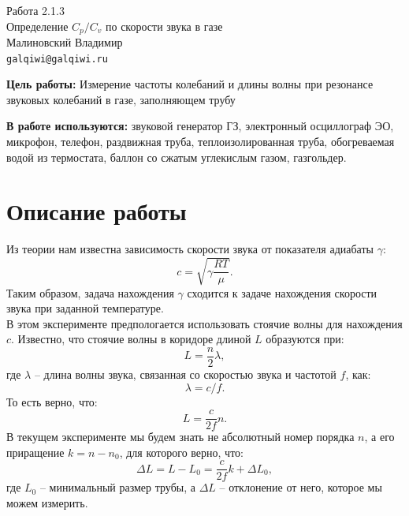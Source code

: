 
\usepackage{booktabs}
\usepackage{multirow}



\begin{center}
  \LARGE{Работа 2.1.3}\\[0.2cm]
  \LARGE{Определение $C_p/C_v$ по скорости звука в газе}\\[0.2cm]
  \large{Малиновский Владимир}\\[0.2cm]
  \normalsize{\texttt{galqiwi@galqiwi.ru}}
\end{center}

\textbf{Цель работы:} Измерение частоты колебаний и длины волны при резонансе звуковых колебаний в газе, заполняющем трубу

\textbf{В работе используются:} звуковой генератор ГЗ, электронный осциллограф ЭО, микрофон, телефон, раздвижная труба, теплоизолированная труба, обогреваемая водой из термостата, баллон со сжатым углекислым газом, газгольдер.

\section*{Описание работы}
Из теории нам известна зависимость скорости звука от показателя адиабаты $\gamma$:
$$c = \sqrt{\gamma\frac{RT}{\mu}}.$$
Таким образом, задача нахождения $\gamma$ сходится к задаче нахождения скорости звука при заданной температуре.\\
В этом эксперименте предпологается использовать стоячие волны для нахождения $c$. Известно, что стоячие волны в коридоре длиной $L$ образуются при:
$$L = \frac{n}{2}\lambda,$$
где $\lambda$ -- длина волны звука, связанная со скоростью звука и частотой $f$, как:
$$\lambda = c/f.$$
То есть верно, что:
$$L = \frac{c}{2f}n.$$
В текущем эксперименте мы будем знать не абсолютный номер порядка $n$, а его приращение $k = n - n_0$, для которого верно, что:
$$\Delta L = L - L_0 = \frac{c}{2f}k + \Delta L_0,$$
где $L_0$ -- минимальный размер трубы, а $\Delta L$ -- отклонение от него, которое мы можем измерить.

\newpage
